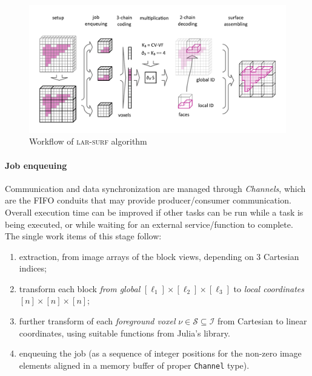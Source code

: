 \begin{figure}[tbp]
\includegraphics[width=\textwidth]{figs/schema_horizontal.pdf} 
\caption{Workflow of \textsc{lar-surf} algorithm}
\label{fig:schema}
\end{figure}



\paragraph{Job enqueuing}
\label{sec:job-enq}
Communication and data synchronization are managed through \emph{Channels}, which are the FIFO conduits that may provide producer/consumer communication. Overall execution time can be improved if other tasks can be run while a task is being executed, or while waiting for an external service/function to complete. The single work items of this stage follow:
\begin{enumerate}

\item extraction, from image arrays of the block views, depending on 3 Cartesian indices;

\item transform  each block \emph{from global} $[\ell_1]\times[\ell_2]\times[\ell_3]$ to \emph{local coordinates} $[n]\times[n]\times[n]$;

\item further transform of each \emph{foreground voxel} $\nu\in\mathcal{S}\subseteq\mathcal{I}$ from Cartesian to linear coordinates, using suitable functions from Julia's library.

\item enqueuing the job (as a sequence of integer positions for the non-zero image elements aligned in a memory buffer of proper \texttt{Channel} type).
\end{enumerate}

